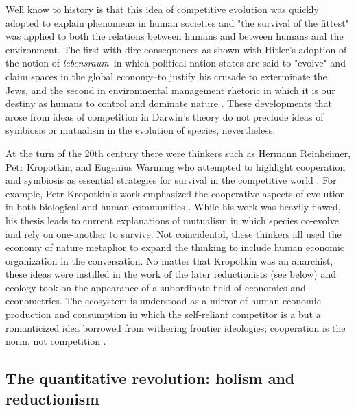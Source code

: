 Well know to history is that this idea of competitive evolution was quickly adopted to explain phenomena in human societies and "the survival of the fittest" was applied to both the relations between humans and between humans and the environment. The first with dire consequences as shown with Hitler's adoption of the notion of \textit{lebensraum}--in which political nation-states are said to "evolve" and claim spaces in the global economy--to justify his crusade to exterminate the Jews, and the second in environmental management rhetoric in which it is our destiny as humans to control and dominate nature \citep{stoddart_1966,worster_1977}. These developments that arose from ideas of competition in Darwin's theory do not preclude ideas of symbiosis or mutualism in the evolution of species, nevertheless. 

At the turn of the 20th century there were thinkers such as Hermann Reinheimer, Petr Kropotkin, and Eugenius Warming who attempted to highlight cooperation and symbiosis as essential strategies for survival in the competitive world \citep{worster_1977}. For example, Petr Kropotkin's work emphasized the cooperative aspects of evolution in both biological and human communities \citep{kropotkin_1902}. While his work was heavily flawed, his thesis leads to current explanations of mutualism in which species co-evolve and rely on one-another to survive. Not coincidental, these thinkers all used the economy of nature metaphor to expand the thinking to include human economic organization in the conversation. No matter that Kropotkin was an anarchist, these ideas were instilled in the work of the later reductionists (see below) and ecology took on the appearance of a subordinate field of economics and econometrics. The ecosystem is understood as a mirror of human economic production and consumption in which the self-reliant competitor is a but a romanticized idea borrowed from withering frontier ideologies; cooperation is the norm, not competition \citep{worster_1977}.

\subsection{The quantitative revolution: holism and reductionism}


